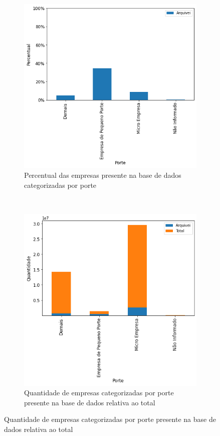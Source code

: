 \begin{figure}[htb]
    \centering
    \caption{Participação por porte das empresas presentes na base de dados}
    \label{fig:base-de-dados:descritiva-4-presenca-por-porte}
    \begin{subfigure}[b]{0.45\textwidth} 
        \includegraphics[scale=0.45]{images/base-de-dados-4.1-presenca-por-porte.png}
        \caption{Percentual das empresas presente na base de dados categorizadas por porte}
        \label{fig:base-de-dados:descritiva-4.1-presenca-por-porte}
    \end{subfigure} ~ \quad
    \begin{subfigure}[b]{0.45\textwidth}
        \includegraphics[scale=0.45]{images/base-de-dados-4.2-qtde-por-porte.png}
        \caption{Quantidade de empresas categorizadas por porte presente na base de dados relativa ao total}
        \label{fig:base-de-dados:descritiva-4.2-qtde-por-porte}
    \end{subfigure}
    \fdadospesquisa
\end{figure}

